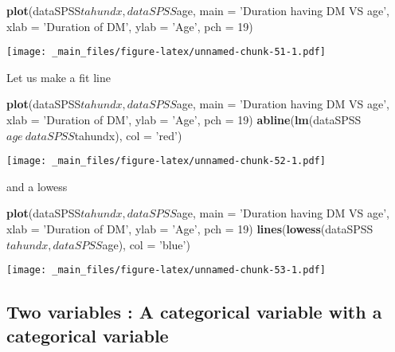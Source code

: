 \documentclass[]{book}
\newenvironment{Shaded}{\begin{snugshade}}{\end{snugshade}}
\newcommand{\KeywordTok}[1]{\textcolor[rgb]{0.13,0.29,0.53}{\textbf{{#1}}}}
\newcommand{\DataTypeTok}[1]{\textcolor[rgb]{0.13,0.29,0.53}{{#1}}}
\newcommand{\DecValTok}[1]{\textcolor[rgb]{0.00,0.00,0.81}{{#1}}}
\newcommand{\StringTok}[1]{\textcolor[rgb]{0.31,0.60,0.02}{{#1}}}
\newcommand{\NormalTok}[1]{{#1}}
\theoremstyle{definition}
\theoremstyle{definition}
\theoremstyle{remark}
\begin{document}
\begin{Shaded}
\begin{Highlighting}[]
\KeywordTok{plot}\NormalTok{(dataSPSS$tahundx, dataSPSS$age,}
     \DataTypeTok{main =} \StringTok{'Duration having DM VS age'}\NormalTok{,}
     \DataTypeTok{xlab =} \StringTok{'Duration of DM'}\NormalTok{, }\DataTypeTok{ylab =} \StringTok{'Age'}\NormalTok{,}
     \DataTypeTok{pch =} \DecValTok{19}\NormalTok{)}
\end{Highlighting}
\end{Shaded}

\texttt{[image: \_main\_files/figure-latex/unnamed-chunk-51-1.pdf]}

Let us make a fit line

\begin{Shaded}
\begin{Highlighting}[]
\KeywordTok{plot}\NormalTok{(dataSPSS$tahundx, dataSPSS$age,}
     \DataTypeTok{main =} \StringTok{'Duration having DM VS age'}\NormalTok{,}
     \DataTypeTok{xlab =} \StringTok{'Duration of DM'}\NormalTok{, }\DataTypeTok{ylab =} \StringTok{'Age'}\NormalTok{,}
     \DataTypeTok{pch =} \DecValTok{19}\NormalTok{)}
\KeywordTok{abline}\NormalTok{(}\KeywordTok{lm}\NormalTok{(dataSPSS$age~dataSPSS$tahundx), }\DataTypeTok{col =} \StringTok{'red'}\NormalTok{)}
\end{Highlighting}
\end{Shaded}

\texttt{[image: \_main\_files/figure-latex/unnamed-chunk-52-1.pdf]}

and a lowess

\begin{Shaded}
\begin{Highlighting}[]
\KeywordTok{plot}\NormalTok{(dataSPSS$tahundx, dataSPSS$age,}
     \DataTypeTok{main =} \StringTok{'Duration having DM VS age'}\NormalTok{,}
     \DataTypeTok{xlab =} \StringTok{'Duration of DM'}\NormalTok{, }\DataTypeTok{ylab =} \StringTok{'Age'}\NormalTok{,}
     \DataTypeTok{pch =} \DecValTok{19}\NormalTok{)}
\KeywordTok{lines}\NormalTok{(}\KeywordTok{lowess}\NormalTok{(dataSPSS$tahundx,dataSPSS$age), }\DataTypeTok{col =} \StringTok{'blue'}\NormalTok{)}
\end{Highlighting}
\end{Shaded}

\texttt{[image: \_main\_files/figure-latex/unnamed-chunk-53-1.pdf]}

\subsection{Two variables : A categorical variable with a categorical
variable}\label{two-variables-a-categorical-variable-with-a-categorical-variable}
\end{document}
